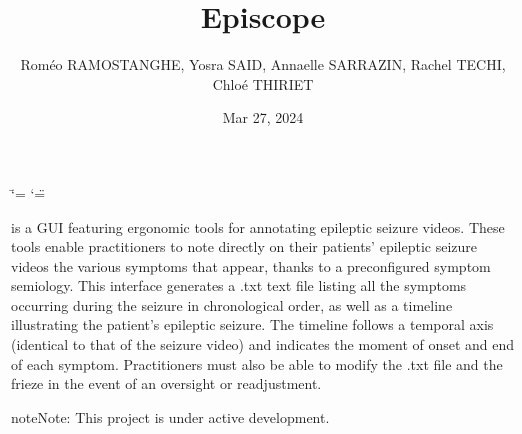 \documentclass[letterpaper,10pt,english]{sphinxmanual}
\title{Episcope}
\date{Mar 27, 2024}
\author{Roméo RAMOS\sphinxhyphen{}\sphinxhyphen{}TANGHE, Yosra SAID, Annaelle SARRAZIN, Rachel TECHI, Chloé THIRIET}
\let\sphinxpxdimen\pdfpxdimen\else\newdimen\sphinxpxdimen
\begin{document}
\ifdefined\shorthandoff
  \ifnum\catcode`\=\string=\active\shorthandoff{=}\fi
  \ifnum\catcode`\"=\active{}\fi
\fi

\pagestyle{empty}
\sphinxmaketitle
\pagestyle{plain}
\sphinxtableofcontents
\pagestyle{normal}
\label{\detokenize{index::doc}}
\noindent{\hspace*{\fill}\sphinxincludegraphics[width=500\sphinxpxdimen,height=110\sphinxpxdimen]{{Logo_final}.png}\hspace*{\fill}}

\sphinxAtStartPar
{} is a GUI featuring ergonomic tools for annotating epileptic seizure videos.
These tools enable practitioners to note directly on their patients’ epileptic seizure videos the various symptoms that appear, thanks to a pre\sphinxhyphen{}configured symptom semiology. This interface generates a .txt text file listing all the symptoms occurring during the seizure in chronological order, as well as a timeline illustrating the patient’s epileptic seizure. The timeline follows a temporal axis (identical to that of the seizure video) and indicates the moment of onset and end of each symptom. Practitioners must also be able to modify the .txt file and the frieze in the event of an oversight or readjustment.

\begin{sphinxadmonition}{note}{Note:}
\sphinxAtStartPar
This project is under active development.
\end{sphinxadmonition}

\sphinxstepscope




\begin{savenotes}\sphinxattablestart
\sphinxthistablewithglobalstyle
\sphinxthistablewithnovlinesstyle
\centering
\begin{tabulary}{\linewidth}[t]{}
\sphinxtoprule
\sphinxtableatstartofbodyhook\sphinxbottomrule
\end{tabulary}
\sphinxtableafterendhook\par
\sphinxattableend\end{savenotes}

\sphinxstepscope
\end{document}
